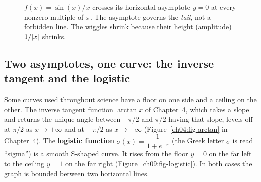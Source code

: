 \begin{figure}[htbp]
\centering
{}
\caption{$f(x)=\sin(x)/x$ crosses its horizontal asymptote $y=0$ at every nonzero
multiple of $\pi$. The asymptote governs the \emph{tail}, not a forbidden line.
The wiggles shrink because their height (amplitude) $1/\lvert x\rvert$ shrinks.}
\label{ch09:fig-sinc}
\end{figure}

\subsection{Two asymptotes, one curve: the inverse tangent and the logistic}

Some curves used throughout science have a floor on one side and a
ceiling on the other. The inverse tangent function $\arctan x$ of Chapter~4,
which takes a
slope and returns the unique angle between $-\pi/2$ and $\pi/2$ having that
slope, levels off at $\pi/2$ as $x\to+\infty$ and at $-\pi/2$ as $x\to-\infty$
(Figure~\ref{ch04:fig-arctan} in Chapter~4).
The \textbf{logistic function} $\sigma(x) = \dfrac{1}{1+e^{-x}}$ (the Greek
letter $\sigma$ is read ``sigma'') is a smooth S-shaped curve. It
rises from the floor $y=0$ on
the far left to the ceiling $y=1$ on the far right
(Figure~\ref{ch09:fig-logistic}). In both cases the graph is
bounded between two horizontal lines.

